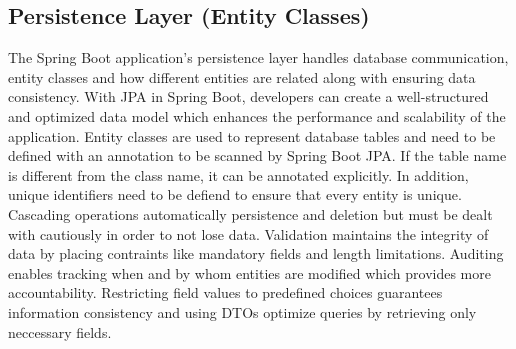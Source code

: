     \subsection{Persistence Layer (Entity Classes)}
    The Spring Boot application's persistence layer handles database communication, entity classes and how different entities are related along with ensuring data consistency. With JPA in Spring Boot, developers can create a well-structured and optimized data model which enhances the performance and scalability of the application. \newline
    Entity classes are used to represent database tables and need to be defined with an annotation to be scanned by Spring Boot JPA. If the table name is different from the class name, it can be annotated explicitly. In addition, unique identifiers need to be defiend to ensure that every entity is unique.\newline
    Cascading operations automatically persistence and deletion but must be dealt with cautiously in order to not lose data. Validation maintains the integrity of data by placing contraints like mandatory fields and length limitations.\newline
    Auditing enables tracking when and by whom entities are modified which provides more accountability. Restricting field values to predefined choices guarantees information consistency and using DTOs optimize queries by retrieving only neccessary fields.


